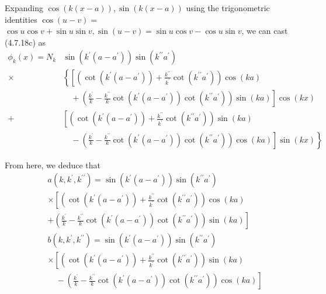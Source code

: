 \documentclass{article}
\begin{document}
Expanding $\cos (k(x-a)), \sin (k(x-a))$ using the trigonometric identities $\cos (u-v)=$ $\cos u \cos v+\sin u \sin v, \sin (u-v)=\sin u \cos v-\cos u \sin v$, we can cast (4.7.18c) as
$$
\begin{align*}
\phi_{k}(x)=N_{k} & \sin \left(k^{\prime}\left(a-a^{\prime}\right)\right) \sin \left(k^{\prime \prime} a^{\prime}\right)  \tag{4.7.26}\\
\times & \left\{\left[\left(\cot \left(k^{\prime}\left(a-a^{\prime}\right)\right)+\frac{k^{\prime \prime}}{k^{\prime}} \cot \left(k^{\prime \prime} a^{\prime}\right)\right) \cos (k a)\right.\right. \\
& \left.\quad+\left(\frac{k^{\prime}}{k}-\frac{k^{\prime \prime}}{k} \cot \left(k^{\prime}\left(a-a^{\prime}\right)\right) \cot \left(k^{\prime \prime} a^{\prime}\right)\right) \sin (k a)\right] \cos (k x) \\
+ & {\left[\left(\cot \left(k^{\prime}\left(a-a^{\prime}\right)\right)+\frac{k^{\prime \prime}}{k^{\prime}} \cot \left(k^{\prime \prime} a^{\prime}\right)\right) \sin (k a)\right.} \\
& \left.\left.\quad-\left(\frac{k^{\prime}}{k}-\frac{k^{\prime \prime}}{k} \cot \left(k^{\prime}\left(a-a^{\prime}\right)\right) \cot \left(k^{\prime \prime} a^{\prime}\right)\right) \cos (k a)\right] \sin (k x)\right\}
\end{align*}
$$

From here, we deduce that
$$
\begin{align*}
& a\left(k, k^{\prime}, k^{\prime \prime}\right)= \sin \left(k^{\prime}\left(a-a^{\prime}\right)\right) \sin \left(k^{\prime \prime} a^{\prime}\right)  \tag{4.7.27a}\\
& \times {\left[\left(\cot \left(k^{\prime}\left(a-a^{\prime}\right)\right)+\frac{k^{\prime \prime}}{k^{\prime}} \cot \left(k^{\prime \prime} a^{\prime}\right)\right) \cos (k a)\right.} \\
&\left.+\left(\frac{k^{\prime}}{k}-\frac{k^{\prime \prime}}{k} \cot \left(k^{\prime}\left(a-a^{\prime}\right)\right) \cot \left(k^{\prime \prime} a^{\prime}\right)\right) \sin (k a)\right] \\
& b\left(k, k^{\prime}, k^{\prime \prime}\right)=\sin \left(k^{\prime}\left(a-a^{\prime}\right)\right) \sin \left(k^{\prime \prime} a^{\prime}\right)  \tag{4.7.27b}\\
& \times {\left[\left(\cot \left(k^{\prime}\left(a-a^{\prime}\right)\right)+\frac{k^{\prime \prime}}{k^{\prime}} \cot \left(k^{\prime \prime} a^{\prime}\right)\right) \sin (k a)\right.} \\
&\left.\quad-\left(\frac{k^{\prime}}{k}-\frac{k^{\prime \prime}}{k} \cot \left(k^{\prime}\left(a-a^{\prime}\right)\right) \cot \left(k^{\prime \prime} a^{\prime}\right)\right) \cos (k a)\right]
\end{align*}
$$
\end{document}
